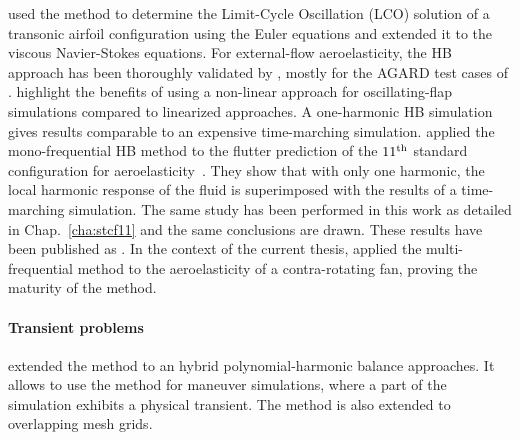 \citet{Thomas2002a} used the method to
determine the Limit-Cycle Oscillation (LCO) solution
of a transonic airfoil configuration using the
Euler equations and \citet{Thomas2004b} extended
it to the viscous Navier-Stokes equations.
For external-flow aeroelasticity, the HB approach has 
been thoroughly 
validated by \citet{Gopinath2005, JSicot2008, Woodgate2009, JDufour2009}, 
mostly for the AGARD test cases of \citet{Davis1982}. 
\citet{JDufour2009} highlight the benefits of using a 
non-linear approach for oscillating-flap simulations
compared to linearized approaches. A one-harmonic HB simulation
gives results comparable to an expensive time-marching simulation.
\citet{Huang2013} applied the mono-frequential
HB method to the flutter prediction of the 
$11\textsuperscript{th}$ 
standard configuration for aeroelasticity~\cite{Fransson1999}.
They show that with only one harmonic, the local
harmonic response of the fluid is superimposed
with the results of a time-marching simulation.
The same study has been performed in this work
as detailed in Chap.~\ref{cha:stcf11}
and the same conclusions are drawn. These results have been
published as \citet{JSicot2012}.
In the context of the current thesis,
\citet{JSicot2013} applied the multi-frequential method to the
aeroelasticity of a contra-rotating fan, proving
the maturity of the method.


\paragraph{Transient problems}
\citet{Mavriplis2012} extended the method to 
an hybrid polynomial-harmonic balance approaches. 
It allows to use the method for maneuver simulations, 
where a part of the simulation exhibits a physical transient.
The method is also extended to overlapping mesh grids.


